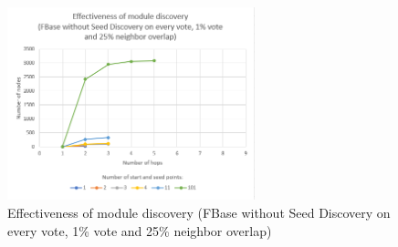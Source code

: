 \begin{figure}[ht!]
	\centering
	\includegraphics[width=0.64\textwidth]{images/evaluation-discovery-fbase-simple-25.png}
	\caption{\label{fig:discovery-fbase-simple-25} Effectiveness of module discovery (FBase without Seed Discovery on every vote, 1\% vote and 25\% neighbor overlap)}
\end{figure}


\newpage

